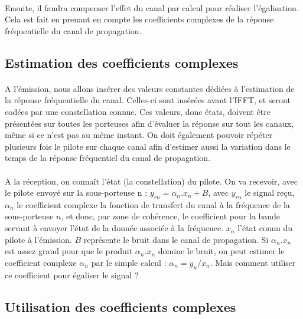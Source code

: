 \paragraph{}
Ensuite, il faudra compenser l'effet du canal par calcul pour réaliser
l'égalisation. Cela est fait en prenant en compte les coefficients complexes de
la réponse fréquentielle du canal de propagation.

\subsection{Estimation des coefficients complexes}
\paragraph{}
A l'émission, nous allons insérer des valeurs constantes dédiées à l'estimation
de la réponse fréquentielle du canal. Celles-ci sont insérées avant l'IFFT, et
seront codées par une constellation connue.
Ces valeurs, donc états, doivent être présentées sur toutes les porteuses afin
d'évaluer la réponse sur tout les canaux, même si ce n'est pas au même instant.
On doit également pouvoir répéter plusieurs fois le pilote sur chaque canal afin d'estimer
aussi la variation dans le temps de la réponse fréquentiel du canal de
propagation.

\paragraph{}
A la réception, on connaît l'état (la constellation) du pilote. On va recevoir,
avec le pilote envoyé sur la sous-porteuse n : $y_{rn}=\alpha_n.x_n+B$, avec
$y_{rn}$ le signal reçu, $\alpha_n$ le coefficient complexe la fonction de
transfert du canal à la fréquence de la sous-porteuse $n$, et donc, par zone de
cohérence, le coefficient pour la bande servant à envoyer l'état de la donnée
associée à la fréquence. $x_n$ l'état connu du pilote à l'émission. $B$
représente le bruit dans le canal de propagation. Si $\alpha_n.x_n$ est assez
grand pour que le produit $\alpha_n.x_n$ domine le bruit, on peut estimer le
coefficient complexe $\alpha_n$ par le simple calcul : $\alpha_n=y_n/x_n$. Mais
comment utiliser ce coefficient pour égaliser le signal ?

\subsection{Utilisation des coefficients complexes}
